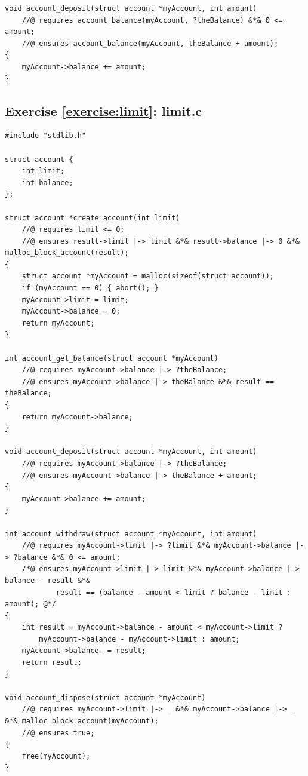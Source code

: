 \documentclass{article}
\begin{document}
\begin{lstlisting}
void account_deposit(struct account *myAccount, int amount)
    //@ requires account_balance(myAccount, ?theBalance) &*& 0 <= amount;
    //@ ensures account_balance(myAccount, theBalance + amount);
{
    myAccount->balance += amount;
}
\end{lstlisting}

\subsection{Exercise \ref{exercise:limit}: limit.c}

\begin{lstlisting}
#include "stdlib.h"

struct account {
    int limit;
    int balance;
};

struct account *create_account(int limit)
    //@ requires limit <= 0;
    //@ ensures result->limit |-> limit &*& result->balance |-> 0 &*& malloc_block_account(result);
{
    struct account *myAccount = malloc(sizeof(struct account));
    if (myAccount == 0) { abort(); }
    myAccount->limit = limit;
    myAccount->balance = 0;
    return myAccount;
}

int account_get_balance(struct account *myAccount)
    //@ requires myAccount->balance |-> ?theBalance;
    //@ ensures myAccount->balance |-> theBalance &*& result == theBalance;
{
    return myAccount->balance;
}

void account_deposit(struct account *myAccount, int amount)
    //@ requires myAccount->balance |-> ?theBalance;
    //@ ensures myAccount->balance |-> theBalance + amount;
{
    myAccount->balance += amount;
}

int account_withdraw(struct account *myAccount, int amount)
    //@ requires myAccount->limit |-> ?limit &*& myAccount->balance |-> ?balance &*& 0 <= amount;
    /*@ ensures myAccount->limit |-> limit &*& myAccount->balance |-> balance - result &*&
            result == (balance - amount < limit ? balance - limit : amount); @*/
{
    int result = myAccount->balance - amount < myAccount->limit ?
        myAccount->balance - myAccount->limit : amount;
    myAccount->balance -= result;
    return result;
}

void account_dispose(struct account *myAccount)
    //@ requires myAccount->limit |-> _ &*& myAccount->balance |-> _ &*& malloc_block_account(myAccount);
    //@ ensures true;
{
    free(myAccount);
}
\end{lstlisting}
\end{document}
